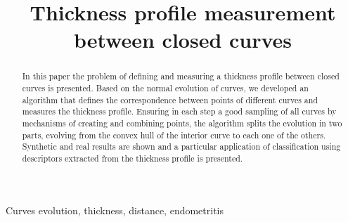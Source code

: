 \documentclass{article}
\title{Thickness profile measurement between closed curves}
\begin{document}
\maketitle

\begin{abstract}
In this paper the problem of defining and measuring a thickness profile between closed curves is presented. Based on the normal evolution of curves, we developed an algorithm that defines the correspondence between points of different curves and measures the thickness profile. Ensuring in each step a good sampling of all curves by mechanisms of creating and combining points, the algorithm splits the evolution in two parts, evolving from the convex hull of the interior curve to each one of the others. Synthetic and real results are shown and a particular application of classification using descriptors extracted from the thickness profile is presented.
\end{abstract}

\begin{keywords}
Curves evolution, thickness, distance, endometritis
\end{keywords}
\end{document}
